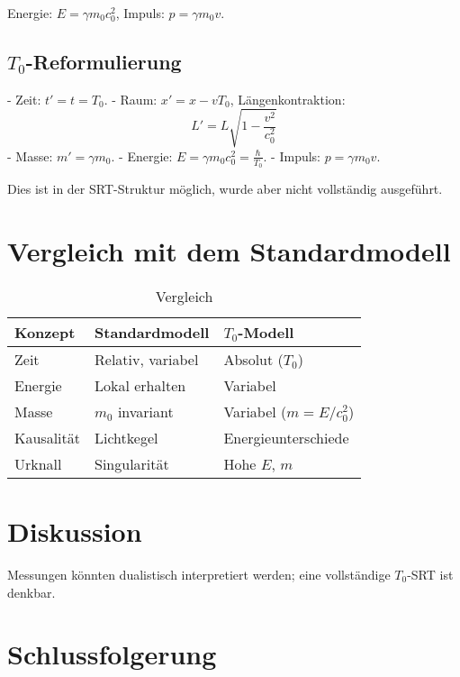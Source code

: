 \documentclass{article}
\begin{document}
	Energie: \( E = \gamma m_0 c_0^2 \), Impuls: \( p = \gamma m_0 v \).
	
	\subsection{\( T_0 \)-Reformulierung}
	
	- Zeit: \( t' = t = T_0 \).
	- Raum: \( x' = x - v T_0 \), Längenkontraktion:
	\[
	L' = L \sqrt{1 - \frac{v^2}{c_0^2}}
	\]
	- Masse: \( m' = \gamma m_0 \).
	- Energie: \( E = \gamma m_0 c_0^2 = \frac{\hbar}{T_0} \).
	- Impuls: \( p = \gamma m_0 v \).
	
	Dies ist in der SRT-Struktur möglich, wurde aber nicht vollständig ausgeführt.
	
	\section{Vergleich mit dem Standardmodell}
	
	\begin{table}[h!]
		\centering
		\begin{tabular}{@{}lll@{}}
			\toprule
			Konzept               & Standardmodell     & \( T_0 \)-Modell \\ \midrule
			Zeit                  & Relativ, variabel  & Absolut (\( T_0 \))     \\
			Energie               & Lokal erhalten     & Variabel                \\
			Masse                 & \( m_0 \) invariant & Variabel (\( m = E/c_0^2 \)) \\
			Kausalität            & Lichtkegel         & Energieunterschiede     \\
			Urknall               & Singularität       & Hohe \( E \), \( m \)   \\ \bottomrule
		\end{tabular}
		\caption{Vergleich}
	\end{table}
	
	\section{Diskussion}
	
	Messungen könnten dualistisch interpretiert werden; eine vollständige \( T_0 \)-SRT ist denkbar.
	
	\section{Schlussfolgerung}
	
\end{document}
